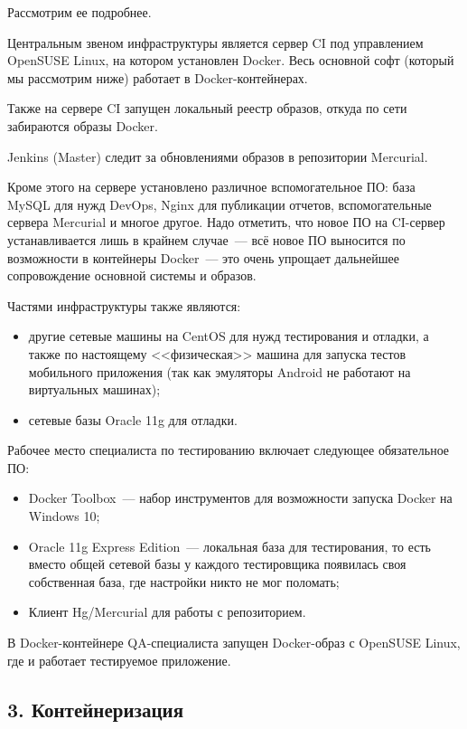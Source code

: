 \documentclass[10pt, a5paper]{article}
\begin{document}
Рассмотрим ее подробнее.

Центральным звеном инфраструктуры является сервер CI под управлением OpenSUSE Linux, на котором установлен Docker. Весь основной софт (который мы рассмотрим ниже) работает в Docker-контейнерах.

Также на сервере CI запущен локальный реестр образов, откуда по сети забираются образы Docker.

Jenkins (Master) следит за обновлениями образов в репозитории Mercurial.

Кроме этого на сервере установлено различное вспомогательное ПО: база MySQL для нужд DevOps, Nginx для публикации отчетов, вспомогательные сервера Mercurial и многое другое. Надо отметить, что новое ПО на CI-сервер устанавливается лишь в крайнем случае~--- всё новое ПО выносится по возможности в контейнеры Docker~--- это очень упрощает дальнейшее сопровождение основной системы и образов.

Частями инфраструктуры также являются:

\begin{itemize}
  \item другие сетевые машины на CentOS для нужд тестирования и отладки, а также по настоящему <<физическая>> машина для запуска тестов мобильного приложения (так как эмуляторы Android не работают на виртуальных машинах);
  \item сетевые базы Oracle 11g для отладки.
\end{itemize}

Рабочее место специалиста по тестированию включает следующее обязательное ПО:

\begin{itemize}
  \item Docker Toolbox~--- набор инструментов для возможности запуска Docker на Windows 10;
  \item Oracle 11g Express Edition~--- локальная база для тестирования, то есть вместо общей сетевой базы у каждого тестировщика появилась своя собственная база, где настройки никто не мог поломать;
  \item Клиент Hg/Mercurial для работы с репозиторием.
\end{itemize}

В Docker-контейнере QA-специалиста запущен Docker-образ с OpenSUSE Linux, где и работает тестируемое приложение.

\subsection*{3. Контейнеризация}
\end{document}

